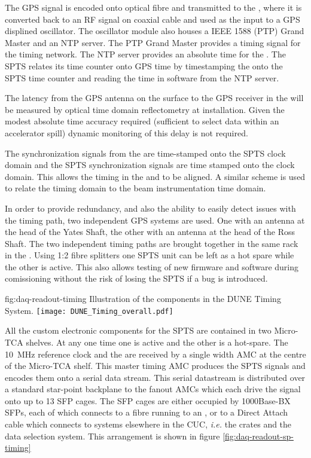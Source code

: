 The GPS signal is encoded onto optical fibre and transmitted to the
, where it is converted back to an RF signal on coaxial cable and
used as the input to a GPS displined oscillator. The oscillator module
also houses a IEEE 1588 (PTP) Grand Master and an NTP server. The PTP
Grand Master provides a timing signal for the  
timing network. The NTP server provides an absolute time for the
. The SPTS relates its time counter onto GPS time by
timestamping the  onto the SPTS time counter and reading
the time in software from the NTP server.

The latency from the GPS antenna on the surface to the GPS receiver in
the  will be measured by optical time domain reflectometry at
installation. Given the modest absolute time accuracy required
(sufficient to select data within an accelerator spill) dynamic
monitoring of this delay is not required.

The  synchronization signals from the   are
time-stamped onto the SPTS clock domain and the SPTS synchronization
signals are time stamped onto the  clock domain. This allows
the timing in the  and   to be
aligned. A similar scheme is used to relate the 
 timing domain to the beam instrumentation
 time domain.

In order to provide redundancy, and also the ability to easily detect
issues with the timing path, two independent GPS systems are used. One
with an antenna at the head of the Yates Shaft, the other with an
antenna at the head of the Ross Shaft. The two independent timing
paths are brought together in the same rack in the . Using 1:2
fibre splitters one SPTS unit can be left as a hot spare while the
other is active. This also allows testing of new firmware and software
during comissioning without the risk of losing the SPTS if a bug is
introduced.


\begin{dunefigure}{fig:daq-readout-timing}
  {Illustration of the components in the DUNE Timing System.}
\texttt{[image: DUNE\_Timing\_overall.pdf]}
\end{dunefigure}

All the custom electronic components for the SPTS are contained in two
Micro-TCA shelves. At any one time one is active and the other is a
hot-spare. The \SI{10}{\MHz} reference clock and the  are received
by a single width AMC at the centre of the Micro-TCA shelf. This
master timing AMC produces the SPTS signals and encodes them onto a
serial data stream. This serial datastream is distributed over a
standard star-point backplane to the fanout AMCs which each drive the
signal onto up to 13 SFP cages. The SFP cages are either occupied by
1000Base-BX SFPs, each of which connects to a fibre running to an ,
or to a Direct Attach cable which connects to systems elsewhere in the
CUC, {\it i.e.} the  crates and the data selection system. This
arrangement is shown in figure \ref{fig:daq-readout-sp-timing}


